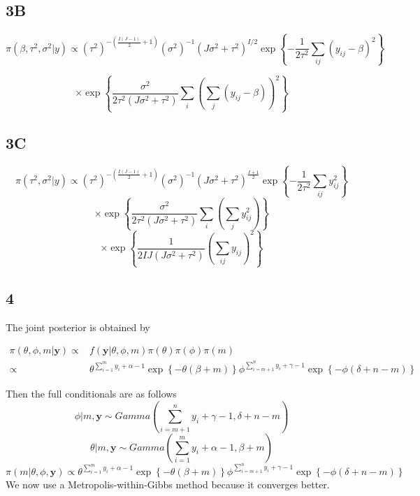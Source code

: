 \documentclass[]{article}
\begin{document}
\subsection{3B}\label{b-2}

\[\pi(\beta, \tau^2, \sigma^2|y) \propto (\tau^2)^{-\left(\frac{I(J-1)}{2} + 1 \right)} (\sigma^2)^{-1} (J\sigma^2 + \tau^2) ^{I/2} \exp\left\{ -\frac{1}{2\tau^2} \sum_{ij} (y_{ij} - \beta)^2 \right\}\]

\[\times \exp\left\{\frac{\sigma^2}{2\tau^2(J\sigma^2 + \tau^2)} \sum_i \left(\sum_j (y_{ij}-\beta) \right)^2 \right\} \]

\subsection{3C}\label{c-1}

\[\pi(\tau^2, \sigma^2|y) \propto (\tau^2)^{-\left(\frac{I(J-1)}{2} + 1 \right)} (\sigma^2)^{-1} \left(J\sigma^2 + \tau^2 \right) ^{\frac{I+1}{2}} \exp \left\{-\frac{1}{2\tau^2} \sum_{ij} y_{ij}^2 \right\}\]
\[ \times \exp\left\{ \frac{\sigma^2}{2\tau^2 (J\sigma^2 + \tau^2)} \sum_i \left( \sum_j y_{ij}^2 \right)\right\}\]
\[ \times \exp\left\{\frac{1}{2IJ (J\sigma^2 + \tau^2)} \left(\sum_{ij} y_{ij} \right)^2 \right\} \]

\subsection{4}\label{section-1}

The joint posterior is obtained by

\begin{align*}
    \pi(\theta,\phi,m|\pmb{y}) \propto & f(\pmb{y}| \theta, \phi, m) \pi(\theta)\pi(\phi)\pi(m)\\
    \propto & \theta^{\sum_{i=1}^m y_i + \alpha -1} \exp \left\{-\theta\left(\beta + m \right) \right\} \phi^{\sum_{i = m+1}^n y_i + \gamma -1} \exp\left\{-\phi (\delta +n -m) \right\}
\end{align*}

Then the full conditionals are as follows
\[\phi|m,\pmb{y} \sim Gamma\left(\sum_{i = m+1}^n y_i + \gamma -1, \delta + n -m\right) \]
\[\theta|m,\pmb{y} \sim Gamma \left(\sum_{i=1}^m y_i + \alpha -1, \beta +m \right) \]
\[\pi(m|\theta,\phi,\pmb{y}) \propto \theta^{\sum_{i=1}^m y_i +\alpha -1} \exp\left\{-\theta(\beta +m) \right\} \phi^{\sum_{i=m+1}^n y_i +\gamma -1} \exp\left\{-\phi(\delta +n -m) \right\} \]
We now use a Metropolis-within-Gibbs method because it converges better.
\end{document}
